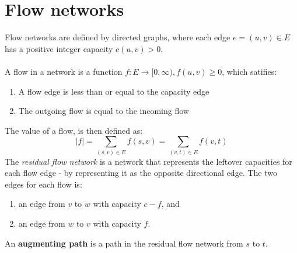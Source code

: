 \documentclass[journal, letterpaper]{IEEEtran}
\begin{document}
  \section{Flow networks}
  Flow networks are defined by directed graphs, where each edge $e = (u, v) \in E$ has a positive integer capacity
  $c(u, v) > 0$. \\ \\ 
  A flow in a network is a function $f : E \to [0, \infty), f(u, v) \ge 0$, which satifies:
  \begin{enumerate}
    \item A flow edge is less than or equal to the capacity edge
    \item The outgoing flow is equal to the incoming flow
  \end{enumerate}
  The value of a flow, is then defined as:
  \[|f| = \sum_{(s, v) \in E}f(s, v) = \sum_{(v, t) \in E} f(v, t) \]
  The \emph{residual flow network} is a network that represents the leftover capacities for each flow edge - by representing
  it as the opposite directional edge. The two edges for each flow is:
  \begin{enumerate}
    \item an edge from $v$ to $w$ with capacity $c - f$, and 
    \item an edge from $w$ to $v$ with capacity $f$.
  \end{enumerate}
  An \textbf{augmenting path} is a path in the residual flow network from $s$ to $t$.
  \pagebreak
\end{document}
